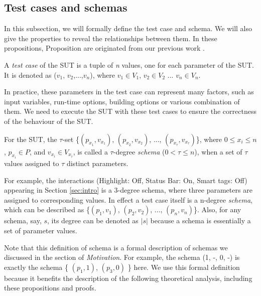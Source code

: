 \newtheorem{assumption}{Assumption}

\subsection{Test cases and schemas}\label{sec:back:testandschema}
In this subsection, we will formally define the test case and schema. We will also give the properties to reveal the relationships between them. In these propositions, Proposition   are originated from our previous work .

\begin{definition}\label{de:testcase}
A \emph{test case} of the SUT is a tuple of \emph{n} values, one for each parameter of the SUT. It is denoted as  ($v_{1}$, $v_{2}$,...,$v_{n}$), where $v_{1}\in V_{1}$, $v_{2} \in V_{2}$ ... $v_{n} \in V_{n}$.
\end{definition}

In practice, these parameters in the test case can represent many factors, such as input variables, run-time options, building options or various combination of them. We need to execute the SUT with these test cases to ensure the correctness of the behaviour of the SUT.

\begin{definition}\label{de:schema}
For the SUT, the $\tau$-set \{$(p_{x_{1}}, v_{x_{1}})$, $(p_{x_{2}}, v_{x_{2}})$, ..., $(p_{x_{\tau}}, v_{x_{\tau}})$\}, where $0 \leq x_{i} \leq n$, $p_{x_{i}} \in P$, and $v_{x_{i}} \in V_{x_{i}}$, is called a $\tau$-degree \emph{schema} ($0 < \tau \leq n $), when a set of $\tau$ values assigned to $\tau$ distinct parameters.
\end{definition}

For example, the interactions (Highlight: Off, Status Bar: On, Smart tags: Off) appearing in Section \ref{sec:intro} is a 3-degree schema, where three parameters are assigned to corresponding values. In effect a test case itself is a n-degree \emph{schema}, which can be described as \{$(p_{1}, v_{1})$, $(p_{2}, v_{2})$, ..., $(p_{n}, v_{n})$\}. Also, for any schema, say, $s$, its degree can be denoted as $|s|$ because a schema is essentially  a set of parameter values.

Note that this definition of schema is a formal description of schemas we discussed in the section of \emph{Motivation}. For example, the schema (1, -, 0, -) is exactly the schema \{ $(p_{1}, 1)$, $(p_{3}, 0)$ \} here. We use this formal definition because it benefits the description of the following theoretical analysis, including these propositions and proofs.

